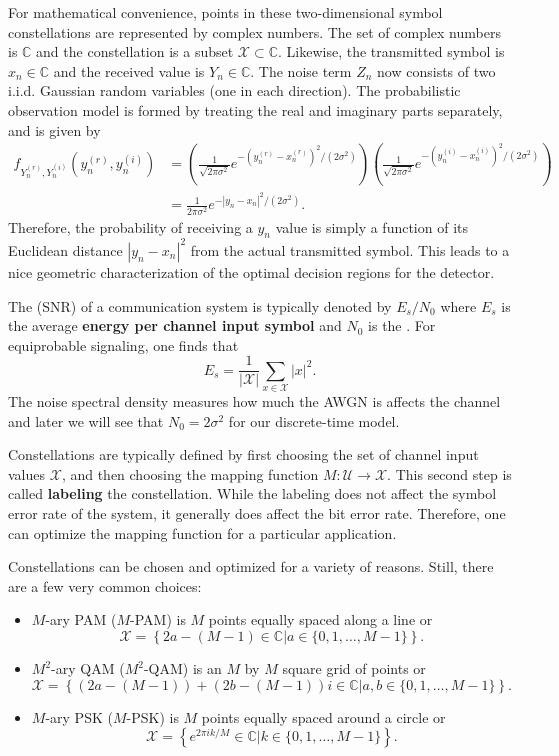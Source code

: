 For mathematical convenience, points in these two-dimensional symbol constellations are represented by complex numbers.
The set of complex numbers is $\mathbb{C}$ and the constellation is a subset $\mathcal{X}\subset\mathbb{C}$.
Likewise, the transmitted symbol is $x_n \in \mathbb{C}$ and the received value is $Y_n \in \mathbb{C}$.
The noise term $Z_n$ now consists of two i.i.d. Gaussian random variables (one in each direction).
The probabilistic observation model is formed by treating the real and imaginary parts separately, and is given by
\begin{align*}
f_{Y^{(r)}_n,Y^{(i)}_n}(y^{(r)}_n,y^{(i)}_n) & =
\left( \frac{1}{\sqrt{2\pi \sigma^2}} e^{-\left(y^{(r)}_n - x^{(r)}_n\right)^2 / (2\sigma^2)} \right)
\left( \frac{1}{\sqrt{2\pi \sigma^2}} e^{-\left(y^{(i)}_n - x^{(i)}_n\right)^2 / (2\sigma^2)} \right) \\
& =  \frac{1}{2\pi \sigma^2} e^{-\left|y_n - x_n\right|^2 / (2\sigma^2)}.
\end{align*}
Therefore, the probability of receiving a $y_n$ value is simply a function of its Euclidean distance $\left| y_n - x_n \right|^2$ from the actual transmitted symbol.
This leads to a nice geometric characterization of the optimal decision regions for the detector.

The  (SNR) of a communication system is typically denoted by $E_s / N_0$ where $E_s$ is the average \textbf{energy per channel input symbol} and $N_0$ is the .
For equiprobable signaling, one finds that
\[ E_s = \frac{1}{|\mathcal{X}|} \sum_{x\in \mathcal{X}} |x|^2. \]
The noise spectral density measures how much the AWGN is affects the channel and later we will see that $N_0 = 2 \sigma^2$ for our discrete-time model.

Constellations are typically defined by first choosing the set of channel input values $\mathcal{X}$, and then choosing the mapping function $M:\mathcal{U} \rightarrow \mathcal{X}$.
This second step is called \textbf{labeling} the constellation.
While the labeling does not affect the symbol error rate of the system, it generally does affect the bit error rate.
Therefore, one can optimize the mapping function for a particular application.

Constellations can be chosen and optimized for a variety of reasons.
Still, there are a few very common choices:
\begin{itemize}
\item $M$-ary PAM ($M$-PAM) is $M$ points equally spaced along a line or
\[ \mathcal{X} = \left\{ 2a-(M-1) \in \mathbb{C} \big| a \in \{0,1,\ldots,M-1\} \right\}. \]

\item $M^2$-ary QAM ($M^2$-QAM) is an $M$ by $M$ square grid of points or
\[ \mathcal{X} = \left\{ \left(2a-(M-1)\right)+ \left(2b-(M-1)\right)i \in \mathbb{C} \big| a,b \in \{0,1,\ldots,M-1\} \right\}. \]

\item $M$-ary PSK ($M$-PSK) is $M$ points equally spaced around a circle or
\[ \mathcal{X} = \left\{ e^{2\pi i k/M} \in \mathbb{C} \big| k \in \{0,1,\ldots,M-1\} \right\}. \]
\end{itemize}


